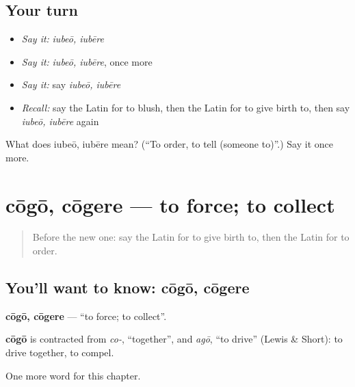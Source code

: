 \subsection*{Your turn}
\begin{itemize}
\raggedright
  \item \emph{Say it:} \emph{iubeō, iubēre}
  \item \emph{Say it:} \emph{iubeō, iubēre}, once more
  \item \emph{Say it:} say \emph{iubeō, iubēre}
  \item \emph{Recall:} say the Latin for to blush, then the Latin for to give birth to, then say \emph{iubeō, iubēre} again
\end{itemize}

\begin{tcolorbox}[breakable,colback=teal!4,colframe=teal!35!black,title={Before you move on}]
What does iubeō, iubēre mean? (\textquotedblleft{}To order, to tell (someone to)\textquotedblright{}.) Say it once more.
\end{tcolorbox}
\section[cōgō, cōgere]{cōgō, cōgere — to force; to collect}

\label{lesson:LA-C261-cogo}



\begin{quote}
Before the new one: say the Latin for to give birth to, then the Latin for to order.
\end{quote}

\subsection*{You'll want to know: cōgō, cōgere}
\textbf{cōgō, cōgere} — \textquotedblleft{}to force; to collect\textquotedblright{}.

\begin{cousinweb}
\textbf{cōgō} is contracted from \emph{co-}, \textquotedblleft{}together\textquotedblright{}, and \emph{agō}, \textquotedblleft{}to drive\textquotedblright{} (Lewis \& Short): to drive together, to compel.
\end{cousinweb}

\begin{grammarlens}[title={What you've built}]
One more word for this chapter.
\end{grammarlens}

